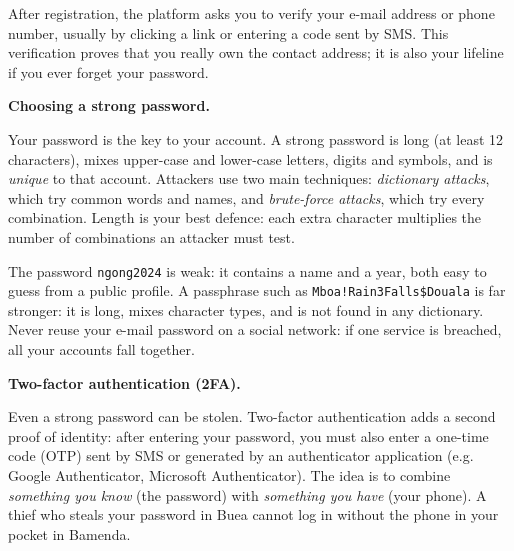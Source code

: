 \documentclass[11pt]{article}
\newcommand{\cle}[1]{{\popxbold\color{popdark}#1}}
\begin{document}
After registration, the platform asks you to \cle{verify} your e-mail address or phone number, usually by clicking a link or entering a code sent by SMS. This verification proves that you really own the contact address; it is also your lifeline if you ever forget your password.

\textbf{Choosing a strong password.}\par
Your password is the key to your account. A \cle{strong password} is long (at least 12 characters), mixes upper-case and lower-case letters, digits and symbols, and is \emph{unique} to that account. Attackers use two main techniques: \emph{dictionary attacks}, which try common words and names, and \emph{brute-force attacks}, which try every combination. Length is your best defence: each extra character multiplies the number of combinations an attacker must test.

\begin{exemplebox}
The password \texttt{ngong2024} is weak: it contains a name and a year, both easy to guess from a public profile. A passphrase such as \texttt{Mboa!Rain3Falls\$Douala} is far stronger: it is long, mixes character types, and is not found in any dictionary. Never reuse your e-mail password on a social network: if one service is breached, all your accounts fall together.
\end{exemplebox}

\textbf{Two-factor authentication (2FA).}\par
Even a strong password can be stolen. \cle{Two-factor authentication} adds a second proof of identity: after entering your password, you must also enter a one-time code (OTP) sent by SMS or generated by an authenticator application (e.g. Google Authenticator, Microsoft Authenticator). The idea is to combine \emph{something you know} (the password) with \emph{something you have} (your phone). A thief who steals your password in Buea cannot log in without the phone in your pocket in Bamenda.
\end{document}
